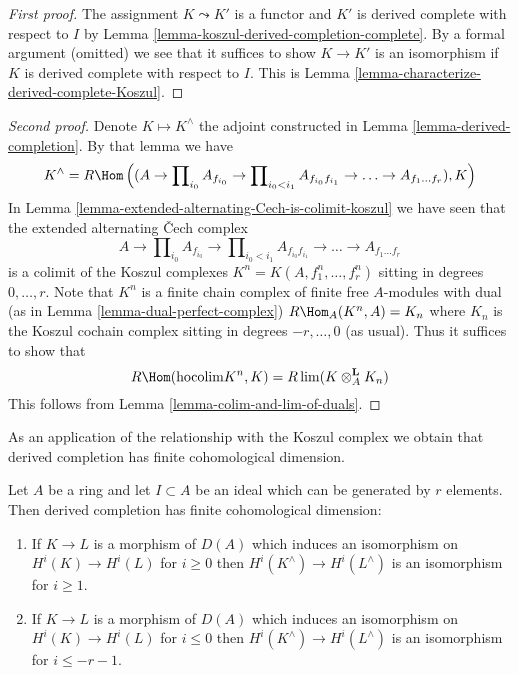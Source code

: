 \begin{proof}[First proof]
The assignment $K \leadsto K'$ is a functor and $K'$ is derived
complete with respect to $I$ by
Lemma \ref{lemma-koszul-derived-completion-complete}.
By a formal argument (omitted) we see that it suffices
to show $K \to K'$ is an isomorphism if $K$ is derived complete
with respect to $I$. This is
Lemma \ref{lemma-characterize-derived-complete-Koszul}.
\end{proof}

\begin{proof}[Second proof]
Denote $K \mapsto K^\wedge$ the adjoint constructed in
Lemma \ref{lemma-derived-completion}. By that lemma we have
$$
K^\wedge = R\Hom\left((A \to \prod\nolimits_{i_0} A_{f_{i_0}} \to
\prod\nolimits_{i_0 < i_1} A_{f_{i_0}f_{i_1}}
\to \ldots \to A_{f_1\ldots f_r}), K\right)
$$
In Lemma \ref{lemma-extended-alternating-Cech-is-colimit-koszul}
we have seen that the extended alternating {\v C}ech complex
$$
A \to \prod\nolimits_{i_0} A_{f_{i_0}} \to
\prod\nolimits_{i_0 < i_1} A_{f_{i_0}f_{i_1}}
\to \ldots \to A_{f_1\ldots f_r}
$$
is a colimit of the Koszul complexes
$K^n = K(A, f_1^n, \ldots, f_r^n)$ sitting in
degrees $0, \ldots, r$. Note that $K^n$ is a finite chain complex
of finite free $A$-modules with dual (as in
Lemma \ref{lemma-dual-perfect-complex})
$R\Hom_A(K^n, A) = K_n$ where $K_n$ is the Koszul cochain
complex sitting in degrees $-r, \ldots, 0$ (as usual).
Thus it suffices to show that
$$
R\Hom(\text{hocolim} K^n, K) =  R\lim (K \otimes_A^\mathbf{L} K_n)
$$
This follows from
Lemma \ref{lemma-colim-and-lim-of-duals}.
\end{proof}

\noindent
As an application of the relationship with the Koszul complex
we obtain that derived completion has finite cohomological dimension.

\begin{lemma}
\label{lemma-derived-completion-finite-cohomological-dimension}
Let $A$ be a ring and let $I \subset A$ be an ideal which can be
generated by $r$ elements. Then derived completion has finite
cohomological dimension:
\begin{enumerate}
\item If $K \to L$ is a morphism of $D(A)$ which induces an isomorphism
on $H^i(K) \to H^i(L)$ for $i \geq 0$ then $H^i(K^\wedge) \to H^i(L^\wedge)$
is an isomorphism for $i \geq 1$.
\item If $K \to L$ is a morphism of $D(A)$ which induces an isomorphism
on $H^i(K) \to H^i(L)$ for $i \leq 0$ then $H^i(K^\wedge) \to H^i(L^\wedge)$
is an isomorphism for $i \leq -r - 1$.
\end{enumerate}
\end{lemma}

